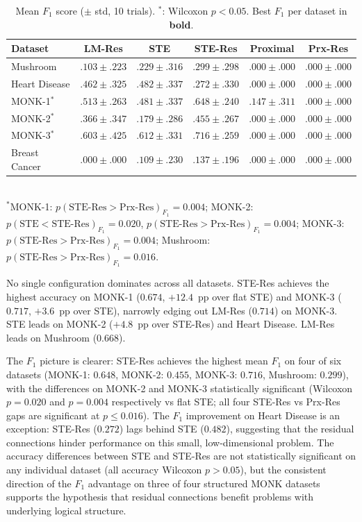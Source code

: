 \documentclass[lettersize,journal]{IEEEtran}
\begin{document}
\begin{table}[t]
\centering
\caption{Mean $F_1$ score ($\pm$ std, 10 trials).
$^{\ast}$: Wilcoxon $p < 0.05$.
Best $F_1$ per dataset in \textbf{bold}.}
\label{tab:f1}
\setlength{\tabcolsep}{5pt}
\begin{tabular}{l ccccc}
\toprule
Dataset & LM-Res & STE & STE-Res & Proximal & Prx-Res \\
\midrule
Mushroom
  & $.103\pm.223$ & $.229\pm.316$ & $\mathbf{.299\pm.298}$
  & $.000\pm.000$ & $.000\pm.000$ \\
Heart Disease
  & $.462\pm.325$ & $\mathbf{.482\pm.337}$ & $.272\pm.330$
  & $.000\pm.000$ & $.000\pm.000$ \\
MONK-1$^{\ast}$
  & $.513\pm.263$ & $.481\pm.337$ & $\mathbf{.648\pm.240}$
  & $.147\pm.311$ & $.000\pm.000$ \\
MONK-2$^{\ast}$
  & $.366\pm.347$ & $.179\pm.286$ & $\mathbf{.455\pm.267}$
  & $.000\pm.000$ & $.000\pm.000$ \\
MONK-3$^{\ast}$
  & $.603\pm.425$ & $.612\pm.331$ & $\mathbf{.716\pm.259}$
  & $.000\pm.000$ & $.000\pm.000$ \\
Breast Cancer
  & $.000\pm.000$ & $.109\pm.230$ & $\mathbf{.137\pm.196}$
  & $.000\pm.000$ & $.000\pm.000$ \\
\bottomrule
\end{tabular}
\smallskip\\
{\footnotesize $^{\ast}$MONK-1: $p(\text{STE-Res} > \text{Prx-Res})_{F_1} = 0.004$;
MONK-2: $p(\text{STE} < \text{STE-Res})_{F_1} = 0.020$,
$p(\text{STE-Res} > \text{Prx-Res})_{F_1} = 0.004$;
MONK-3: $p(\text{STE-Res} > \text{Prx-Res})_{F_1} = 0.004$;
Mushroom: $p(\text{STE-Res} > \text{Prx-Res})_{F_1} = 0.016$.}
\end{table}

No single configuration dominates across all datasets.
STE-Res achieves the highest accuracy on MONK-1 ($0.674$, $+12.4$~pp over
flat STE) and MONK-3 ($0.717$, $+3.6$~pp over STE), narrowly edging out
LM-Res ($0.714$) on MONK-3.
STE leads on MONK-2 ($+4.8$~pp over STE-Res) and Heart Disease.
LM-Res leads on Mushroom ($0.668$).

The $F_1$ picture is clearer: STE-Res achieves the highest mean $F_1$ on four
of six datasets (MONK-1: $0.648$, MONK-2: $0.455$, MONK-3: $0.716$, Mushroom:
$0.299$), with the differences on MONK-2 and MONK-3 statistically significant
(Wilcoxon $p = 0.020$ and $p = 0.004$ respectively vs flat STE; all four
STE-Res vs Prx-Res gaps are significant at $p \leq 0.016$).
The $F_1$ improvement on Heart Disease is an exception: STE-Res ($0.272$) lags
behind STE ($0.482$), suggesting that the residual connections hinder
performance on this small, low-dimensional problem.
The accuracy differences between STE and STE-Res are not statistically
significant on any individual dataset (all accuracy Wilcoxon $p > 0.05$), but
the consistent direction of the $F_1$ advantage on three of four structured
MONK datasets supports the hypothesis that residual connections benefit
problems with underlying logical structure.
\end{document}
